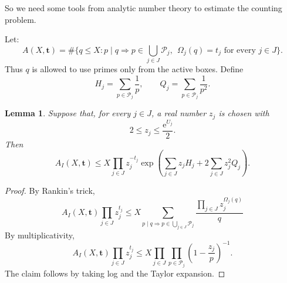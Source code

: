 \documentclass[11pt]{amsart}
\newtheorem{lem}[thm]{Lemma}
\theoremstyle{remark}
\begin{document}
So we need some tools from analytic number theory to estimate the counting problem.

Let:
\[
 A(X,\mathbf t)=
 \#\{q\le X:p\mid q\Rightarrow p\in\bigcup_{j\in J}\mathcal P_j,\
       \ \Omega_j(q)=t_j\text{ for every }j\in J\}.
\]
Thus $q$ is allowed to use primes only from the active boxes.  Define
\begin{equation}\label{eq:HjQj}
 H_j=\sum_{p\in\mathcal P_j}\frac1p,
 \qquad
 Q_j=\sum_{p\in\mathcal P_j}\frac1{p^2}.
\end{equation}

\begin{lem}\label{lem:multi-moment}
Suppose that, for every $j\in J$, a real number $z_j$ is chosen with
\begin{equation}
 2\le z_j\le \frac{\mathrm e^{U_j}}2.
\end{equation}
Then
\begin{equation}
 A_I(X,\mathbf t)
 \le X\prod_{j\in J} z_j^{-t_j}
 \exp\!\left(\sum_{j\in J} z_jH_j
              +2\sum_{j\in J}z_j^2Q_j\right).
\end{equation}
\end{lem}

\begin{proof}
By Rankin's trick,
\[
 A_I(X,\mathbf t)\prod_{j\in J}z_j^{t_j}
 \le X \sum_{p \mid q\Rightarrow
        p\in\bigcup_{j\in J}\mathcal P_j}
      \frac{\prod_{j\in J}z_j^{\Omega_j(q)}}{q}
\]
By multiplicativity, 
\[
 A_I(X,\mathbf t)\prod_{j\in J}z_j^{t_j}
 \le X\prod_{j\in J}\prod_{p\in\mathcal P_j}
 \left(1-\frac{z_j}{p}\right)^{-1}.
\]
The claim follows by taking log and the Taylor expansion.
\end{proof}
\end{document}

